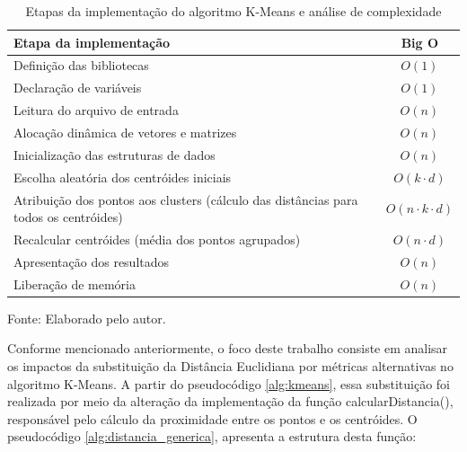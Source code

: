 \documentclass[10pt,a4paper,twocolumn]{article}
\begin{document}
\begin{table}[H]
\centering
\caption{Etapas da implementação do algoritmo K-Means e análise de complexidade}
\label{tab:complexidade_kmeans}

\begin{tabularx}{\columnwidth}{|>{\raggedright\arraybackslash}X|c|}
\hline
\textbf{Etapa da implementação} &
\textbf{Big O} \\ \hline

Definição das bibliotecas &
$O(1)$ \\ \hline

Declaração de variáveis &
$O(1)$ \\ \hline

Leitura do arquivo de entrada &
$O(n)$ \\ \hline

Alocação dinâmica de vetores e matrizes &
$O(n)$ \\ \hline

Inicialização das estruturas de dados &
$O(n)$ \\ \hline

Escolha aleatória dos centróides iniciais &
$O(k\cdot d)$ \\ \hline

Atribuição dos pontos aos clusters
(cálculo das distâncias para todos os centróides) &
$O(n\cdot k\cdot d)$ \\ \hline

Recalcular centróides
(média dos pontos agrupados) &
$O(n\cdot d)$ \\ \hline

Apresentação dos resultados &
$O(n)$ \\ \hline

Liberação de memória &
$O(n)$ \\ \hline

\end{tabularx}

\smallskip
\footnotesize
Fonte: Elaborado pelo autor.

\end{table}

Conforme mencionado anteriormente, o foco deste trabalho consiste em analisar os impactos da substituição da Distância Euclidiana por métricas alternativas no algoritmo K-Means. A partir do pseudocódigo \ref{alg:kmeans}, essa substituição foi realizada por meio da alteração da implementação da função calcularDistancia(), responsável pelo cálculo da proximidade entre os pontos e os centróides. O pseudocódigo \ref{alg:distancia_generica}, apresenta a estrutura desta função:
\end{document}
